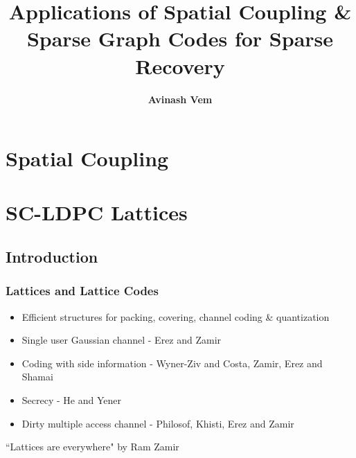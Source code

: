 \documentclass[10pt]{beamer}
\begin{document}
\title{\bf Applications of Spatial Coupling \& \\ Sparse Graph Codes for Sparse Recovery}
\author{\textbf{Avinash Vem}} 
\vspace{10pt}


\date{} %
\frame{\titlepage}

\section{Spatial Coupling}

\section{SC-LDPC Lattices}
\subsection{Introduction}
\begin{frame}\frametitle{Lattices and Lattice Codes}
    		\begin{itemize}
    		 \item Efficient structures for packing, covering, channel coding \& quantization
            \item Single user Gaussian channel - Erez and Zamir
			\item Coding with side information - Wyner-Ziv and Costa, Zamir, Erez and Shamai
			\item Secrecy - He and Yener
			\item Dirty multiple access channel - Philosof, Khisti, Erez and Zamir
	\end{itemize}
	\vspace{5pt}
	
``Lattices are everywhere" by Ram Zamir
\end{frame}
\end{document}
